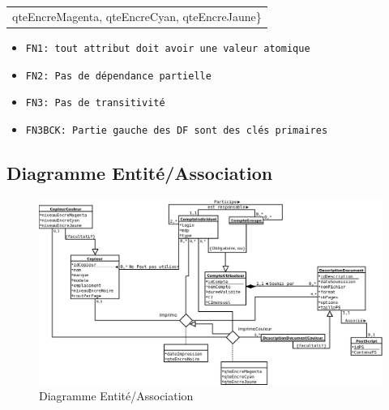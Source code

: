 \documentclass{beamer}
\begin{document}
\begin{frame}
\begin{tabular}{p{10cm}}
            qteEncreMagenta, qteEncreCyan, qteEncreJaune\}\\
          \end{tabular}
        \pause
  \begin{itemize}
  \item {\tt FN1: tout attribut doit avoir une valeur atomique}
        \pause
  \item {\tt FN2: Pas de dépendance partielle}
        \pause
  \item {\tt FN3: Pas de transitivité}
        \pause
  \item {\tt FN3BCK: Partie gauche des DF sont des clés primaires}
  \end{itemize}
\end{frame}


\subsection{Diagramme Entité/Association}

\begin{frame} %
        \begin{figure}[h!]
          \begin{center}
            \includegraphics[width=1\textwidth]{diagramme.png}
            \caption{Diagramme Entité/Association}
          \end{center}
        \end{figure}

\end{frame}
\end{document}
